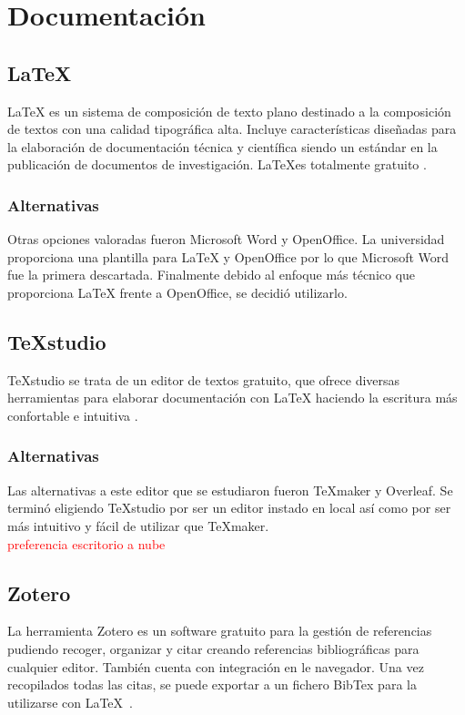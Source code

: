 \section{Documentación}\label{Documentación}
	\subsection{\LaTeX}\label{LaTex}
\LaTeX{} es un sistema de composición de texto plano destinado a la composición de textos con una calidad tipográfica alta. Incluye características diseñadas para la elaboración de documentación técnica y científica siendo un estándar en la publicación de documentos de investigación. \LaTeX es totalmente gratuito \cite{latex}.
	\subsubsection{Alternativas}\label{AlternativasLatex}
Otras opciones valoradas fueron Microsoft Word y OpenOffice. La universidad proporciona una plantilla para \LaTeX{} y OpenOffice por lo que Microsoft Word fue la primera descartada. Finalmente debido al enfoque más técnico que proporciona \LaTeX{} frente a OpenOffice, se decidió utilizarlo.
	\subsection{\TeX studio}\label{Texmaker}
\TeX studio{} se trata de un editor de textos gratuito, que ofrece diversas herramientas para elaborar documentación con \LaTeX{} haciendo la escritura más confortable e intuitiva \cite{texstudio}.
	\subsubsection{Alternativas}\label{AlternativasTexmaker}
Las alternativas a este editor que se estudiaron fueron \TeX maker y Overleaf. Se terminó eligiendo \TeX studio por ser un editor instado en local así como por ser más intuitivo y fácil de utilizar que \TeX maker.\\
\textcolor{red}{preferencia escritorio a nube}
	\subsection{Zotero}\label{zotero}
La herramienta Zotero es un software gratuito para la gestión de referencias pudiendo recoger, organizar y citar creando referencias bibliográficas para cualquier editor. También cuenta con integración en le navegador. Una vez recopilados todas las citas, se puede exportar a un fichero BibTex para la utilizarse con \LaTeX{}~\cite{zotero}.
